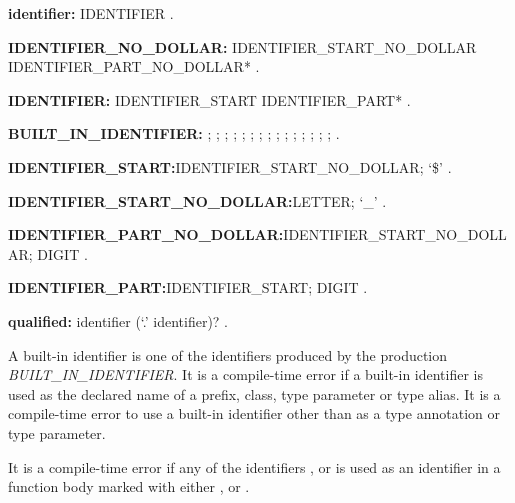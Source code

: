\documentclass{article}
\begin{document}
\begin{grammar}
{\bf identifier:}
     IDENTIFIER
     .
     
         
 {\bf IDENTIFIER\_NO\_DOLLAR:}
      IDENTIFIER\_START\_NO\_DOLLAR IDENTIFIER\_PART\_NO\_DOLLAR*
    .

{\bf IDENTIFIER:}
      IDENTIFIER\_START IDENTIFIER\_PART*
    .

{\bf BUILT\_IN\_IDENTIFIER:} \ABSTRACT{};
     \AS{};
     \DEFERRED{};
     \DYNAMIC{};
     \EXPORT{};
     \EXTERNAL{};
     \FACTORY{};
     \GET{};
     \IMPLEMENTS{};
     \IMPORT{};
     \LIBRARY{};
     \OPERATOR{};
     \PART{};
      \SET{};
      \STATIC{};
     \TYPEDEF{}
    .

 {\bf IDENTIFIER\_START:}IDENTIFIER\_START\_NO\_DOLLAR;
      `\$'
    .

{\bf IDENTIFIER\_START\_NO\_DOLLAR:}LETTER;
      `\_'
    .

{\bf  IDENTIFIER\_PART\_NO\_DOLLAR:}IDENTIFIER\_START\_NO\_DOLLAR;
      DIGIT
    .


{\bf IDENTIFIER\_PART:}IDENTIFIER\_START;
      DIGIT
    .



{\bf qualified:}
      identifier (`{\escapegrammar .}' identifier)?  
      . 
\end{grammar}

\LMHash{}
A built-in identifier is one of the identifiers produced by the production {\em BUILT\_IN\_IDENTIFIER}. It is a compile-time error if a built-in identifier is used as the declared name of a prefix, class, type parameter or type alias. It is a compile-time error to use a built-in identifier other than \DYNAMIC{} as a type annotation or type parameter.


\LMHash{}
It is a compile-time error if any of the identifiers \ASYNC, \AWAIT{} or \YIELD{} is used as an identifier in a function body marked with either \ASYNC{}, \ASYNC* or \SYNC*.
\end{document}
